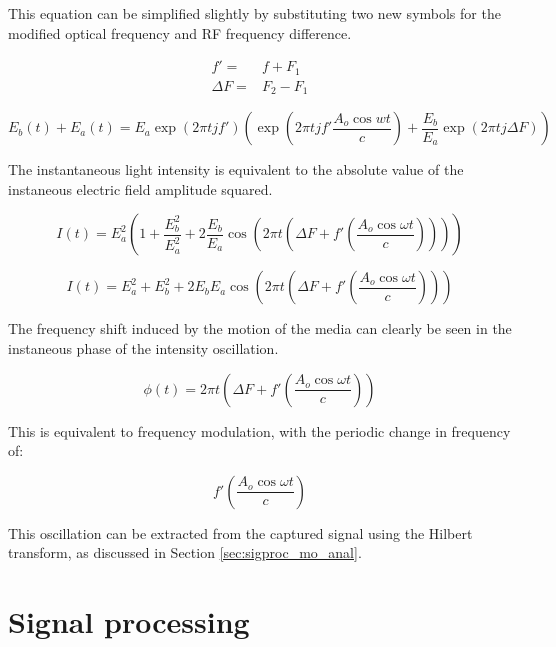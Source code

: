 This equation can be simplified slightly by substituting two new symbols for the modified optical frequency and RF frequency difference.

\begin{align*}
f' = & f + F_1 \\
\Delta F = & F_2 - F_1
\end{align*}

\begin{dmath}
E_b(t) + E_a(t) = E_a \exp{(2 \pi t j f')}\left(\exp{\left(2 \pi t j f' \frac{ A_o \cos{wt}}{c}\right)} + \frac{E_b}{E_a} \exp{(2 \pi t j \Delta F)}\right)
\end{dmath}

The instantaneous light intensity is equivalent to the absolute value of the instaneous electric field amplitude squared.

\begin{dmath}
I(t) = E_a^2 \left(1 + \frac{E_b^2}{E_a^2} + 2 \frac{E_b}{E_a} \cos{\left(2 \pi t \left(\Delta F + f' \left( \frac{A_o \cos{\omega t}}{c} \right) \right)\right)} \right)
\end{dmath}

\begin{dmath}
I(t) = E_a^2 + E_b^2 + 2 E_b E_a \cos{\left(2 \pi t \left(\Delta F + f' \left( \frac{A_o \cos{\omega t}}{c} \right)  \right)\right)}
\end{dmath}

The frequency shift induced by the motion of the media can clearly be seen in the instaneous phase of the intensity oscillation.

\begin{dmath}
\label{eq:phase_aom_doppler}
\phi(t) = 2 \pi t \left(\Delta F + f' \left( \frac{A_o \cos{\omega t}}{c} \right)   \right)
\end{dmath}

This is equivalent to frequency modulation, with the periodic change in frequency of:

\begin{equation}
f' \left( \frac{A_o \cos{\omega t}}{c} \right)
\end{equation}

This oscillation can be extracted from the captured signal using the Hilbert transform, as discussed in Section \ref{sec:sigproc_mo_anal}.

\section{Signal processing}

